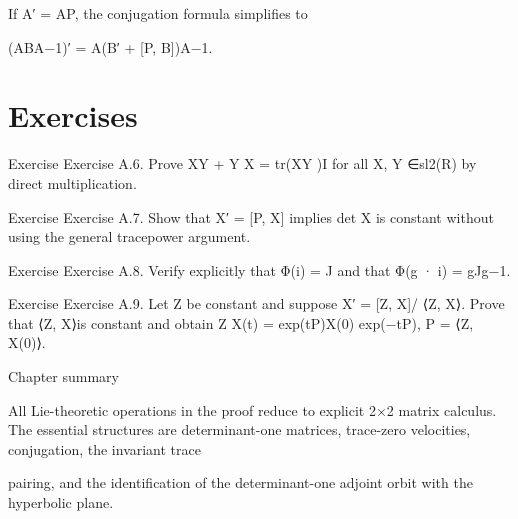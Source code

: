 If A′ = AP, the conjugation formula simplifies to


(ABA−1)′ = A(B′ + [P, B])A−1.


\section{Exercises}

\begin{statementbox}{Exercise}
Exercise A.6. Prove XY + Y X = tr(XY )I for all X, Y ∈sl2(R) by direct multiplication.
\end{statementbox}

\begin{statementbox}{Exercise}
Exercise A.7. Show that X′ = [P, X] implies det X is constant without using the general tracepower argument.
\end{statementbox}

\begin{statementbox}{Exercise}
Exercise A.8. Verify explicitly that Φ(i) = J and that Φ(g · i) = gJg−1.
\end{statementbox}

\begin{statementbox}{Exercise}
Exercise A.9. Let Z be constant and suppose X′ = [Z, X]/ ⟨Z, X⟩. Prove that ⟨Z, X⟩is constant and obtain Z X(t) = exp(tP)X(0) exp(−tP), P = ⟨Z, X(0)⟩.
\end{statementbox}

\begin{insightbox}{Chapter summary}
\end{insightbox}

All Lie-theoretic operations in the proof reduce to explicit 2×2 matrix calculus. The essential structures are determinant-one matrices, trace-zero velocities, conjugation, the invariant trace


pairing, and the identification of the determinant-one adjoint orbit with the hyperbolic plane.


